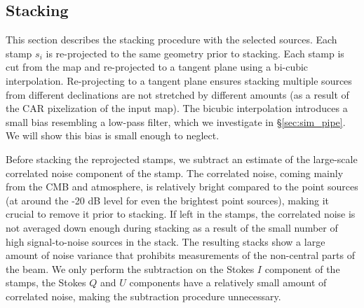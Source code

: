 \subsection{Stacking}
\label{subsec:stacking}
This section describes the stacking procedure with the selected sources.  Each stamp $s_i$ is re-projected to the same geometry prior to stacking.  Each stamp is cut from the map and re-projected to a tangent plane using a bi-cubic interpolation.  Re-projecting to a tangent plane ensures stacking multiple sources from different declinations are not stretched by different amounts (as a result of the CAR pixelization of the input map).  The bicubic interpolation introduces a small bias resembling a low-pass filter, which we investigate in \S\ref{sec:sim_pipe}.  We will show this bias is small enough to neglect.

Before stacking the reprojected stamps, we subtract an estimate of the large-scale correlated noise component of the stamp. The correlated noise, coming mainly from the CMB and atmosphere, is relatively bright compared to the point sources (at around the -20 dB level for even the brightest point sources), making it crucial to remove it prior to stacking.  If left in the stamps, the correlated noise is not averaged down enough during stacking as a result of the small number of high signal-to-noise sources in the stack. The resulting stacks show a large amount of noise variance that prohibits measurements of the non-central parts of the beam. We only perform the subtraction on the Stokes $I$ component of the stamps, the Stokes $Q$ and $U$ components have a relatively small amount of correlated noise, making the subtraction procedure unnecessary.

